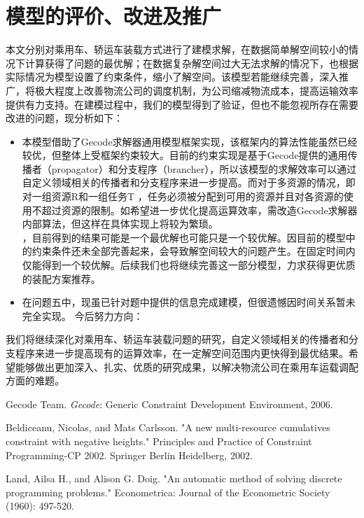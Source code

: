 \documentclass[UTF8，12pt]{ctexart}
\begin{document}
\section{模型的评价、改进及推广}
本文分别对乘用车、轿运车装载方式进行了建模求解，在数据简单解空间较小的情况下计算获得了问题的最优解；在数据复杂解空间过大无法求解的情况下，也根据实际情况为模型设置了约束条件，缩小了解空间。该模型若能继续完善，深入推广，将极大程度上改善物流公司的调度机制，为公司缩减物流成本，提高运输效率提供有力支持。在建模过程中，我们的模型得到了验证，但也不能忽视所存在需要改进的问题，现分析如下：
\begin{itemize}
     \item	本模型借助了Gecode求解器通用模型框架实现，该框架内的算法性能虽然已经较优，但整体上受框架约束较大。目前的约束实现是基于Gecode提供的通用传播者（propagator）和分支程序（brancher），所以该模型的求解效率可以通过自定义领域相关的传播者和分支程序来进一步提高。而对于多资源的情况，即对一组资源R和一组任务T ，任务必须被分配到可用的资源并且对各资源的使用不超过资源的限制。如希望进一步优化提高运算效率，需改造Gecode求解器内部算法，但这样在具体实现上将较为繁琐。\\
     ，目前得到的结果可能是一个最优解也可能只是一个较优解。因目前的模型中的约束条件还未全部完善起来，会导致解空间较大的问题产生。在固定时间内仅能得到一个较优解。后续我们也将继续完善这一部分模型，力求获得更优质的装配方案推荐。\\
      \item	在问题五中，现虽已针对题中提供的信息完成建模，但很遗憾因时间关系暂未完全实现。
今后努力方向：
\end{itemize}


我们将继续深化对乘用车、轿运车装载问题的研究，自定义领域相关的传播者和分支程序来进一步提高现有的运算效率，在一定解空间范围内更快得到最优结果。希望能够做出更加深入、扎实、优质的研究成果，以解决物流公司在乘用车运载调配方面的难题。





\begin{thebibliography}{1}  %
 Gecode Team.  \textit{Gecode}: Generic Constraint
  Development Environment, 2006. 
  
Beldiceanu, Nicolas, and Mats Carlsson. "A new multi-resource cumulatives constraint with negative heights." Principles and Practice of Constraint Programming-CP 2002. Springer Berlin Heidelberg, 2002. 

 Land, Ailsa H., and Alison G. Doig. "An automatic method of solving discrete programming problems." Econometrica: Journal of the Econometric Society (1960): 497-520.


\end{thebibliography}
\end{document}
